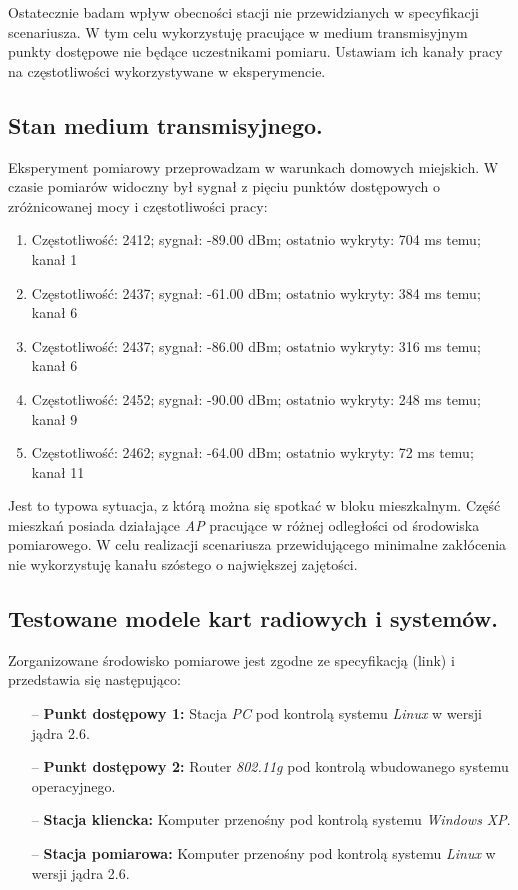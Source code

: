 Ostatecznie badam wpływ obecności stacji nie przewidzianych w specyfikacji scenariusza. W tym celu wykorzystuję pracujące w medium transmisyjnym punkty dostępowe nie będące uczestnikami pomiaru. Ustawiam ich kanały pracy na częstotliwości wykorzystywane w eksperymencie. 

\subsection{Stan medium transmisyjnego.}

Eksperyment pomiarowy przeprowadzam w warunkach domowych miejskich. W czasie pomiarów widoczny był sygnał z pięciu punktów dostępowych o zróżnicowanej mocy i częstotliwości pracy:

\begin{enumerate}
\item Częstotliwość: 2412; sygnał: -89.00 dBm; ostatnio wykryty: 704 ms temu; kanał 1
\item Częstotliwość: 2437; sygnał: -61.00 dBm; ostatnio wykryty: 384 ms temu; kanał 6
\item Częstotliwość: 2437; sygnał: -86.00 dBm; ostatnio wykryty: 316 ms temu; kanał 6
\item Częstotliwość: 2452; sygnał: -90.00 dBm; ostatnio wykryty: 248 ms temu; kanał 9
\item Częstotliwość: 2462; sygnał: -64.00 dBm; ostatnio wykryty: 72 ms temu; kanał 11
\end{enumerate}

Jest to typowa sytuacja, z którą można się spotkać w bloku mieszkalnym. Część mieszkań posiada działające \emph{AP} pracujące w różnej odległości od środowiska pomiarowego. W celu realizacji scenariusza przewidującego minimalne zakłócenia nie wykorzystuję kanału szóstego o największej zajętości.

\subsection{Testowane modele kart radiowych i systemów.}

Zorganizowane środowisko pomiarowe jest zgodne ze specyfikacją (link) i przedstawia się następująco:
\begin{itemize}
\item[--] {\bf Punkt dostępowy 1:} Stacja \emph{PC} pod kontrolą systemu \emph{Linux} w wersji jądra 2.6.
\item[--] {\bf Punkt dostępowy 2:} Router \emph{802.11g} pod kontrolą wbudowanego systemu operacyjnego.
\item[--] {\bf Stacja kliencka:} Komputer przenośny pod kontrolą systemu \emph{Windows XP}.
\item[--] {\bf Stacja pomiarowa:} Komputer przenośny pod kontrolą systemu \emph{Linux} w wersji jądra 2.6.
\end{itemize}

